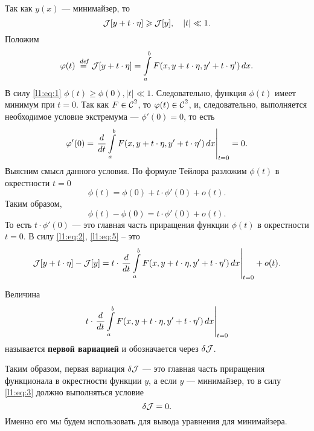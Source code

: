 Так как $y(x)$ --- минимайзер, то 
\begin{equation}
	\label{l1:eq:1}
	\J[y+t\cdot\eta]\geqslant\J[y],\quad |t|\ll1.
\end{equation}
Положим 
\begin{equation}
	\label{l1:eq:2}
	\phi(t)\eqdef\J[y+t\cdot\eta]=\int\limits_a^b F(x,y+t\cdot\eta,y'+t\cdot\eta')\,\dd{x}.
\end{equation}
В силу \eqref{l1:eq:1} $\phi(t)\geqslant\phi(0), |t|\ll1$. Следовательно, функция $\phi(t)$ имеет минимум при $t=0$. Так как $F\in\Cfn[]{2}$, то $\phi(t)\in\Cfn[]{2}$, и, следовательно, выполняется необходимое условие экстремума --- $\phi'(0)=0$, то есть
\begin{equation}
	\label{l1:eq:3}
	\phi'(0)=\left.\der{}{t}\int\limits_a^b F(x,y+t\cdot\eta,y'+t\cdot\eta')\,\dd{x}\right|_{t=0}=0.
\end{equation}
Выясним смысл данного условия. По формуле Тейлора разложим $\phi(t)$ в окрестности $t=0$
\begin{equation}
	\label{l1:eq:4}
	\phi(t)=\phi(0)+t\cdot\phi'(0)+o(t).
\end{equation}
Таким образом{\mb,}
\begin{equation}
	\label{l1:eq:5}
	\phi(t)-\phi(0)=t\cdot\phi'(0)+o(t).
\end{equation}
То есть $t\cdot\phi'(0)$ --- это главная часть приращения функции $\phi(t)$ в окрестности $t=0$. В силу \eqref{l1:eq:2}, \eqref{l1:eq:5} -- это 
\begin{equation}
	\label{l1:eq:6}
	\J[y+t\cdot\eta]-\J[y]=t\cdot\left.\der{}{t}\int\limits_a^b F(x,y+t\cdot\eta,y'+t\cdot\eta')\,\dd{x}\right|_{t=0}+o(t).
\end{equation}
\begin{Def}
	Величина 
	\begin{equation*}
		t\cdot\left.\der{}{t}\int\limits_a^b F(x,y+t\cdot\eta,y'+t\cdot\eta')\,\dd{x}\right|_{t=0}
	\end{equation*} 
	называется \textbf{первой вариацией} и обозначается через $\delta\J$.
\end{Def}

Таким образом, первая вариация $\delta\J$ --- это главная часть приращения функционала в окрестности функции $y$, а если $y$ --- минимайзер, то в силу \eqref{l1:eq:3} должно выполняться условие
\begin{equation}
	\label{l1:eq:7}
	\delta\J=0.
\end{equation}
Именно его мы будем использовать для вывода уравнения для минимайзера.

